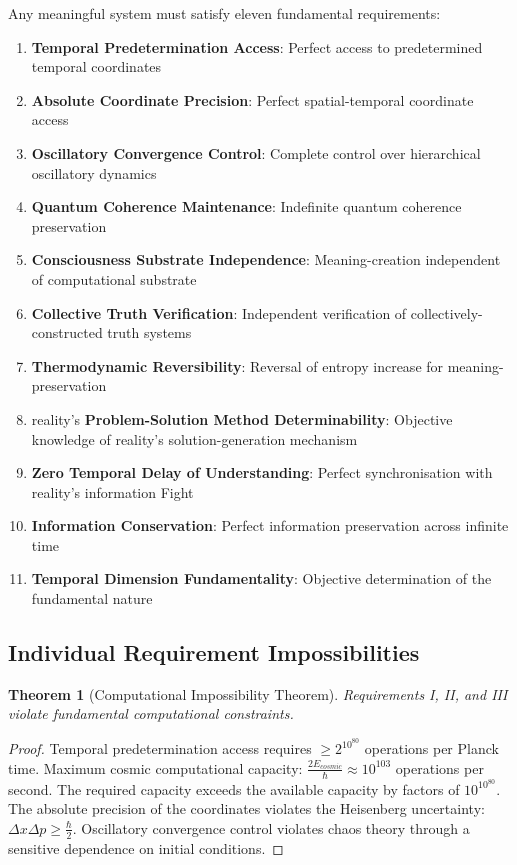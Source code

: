 \documentclass[12pt,a4paper]{article}
\newtheorem{theorem}{Theorem}[section]
\begin{document}
Any meaningful system must satisfy eleven fundamental requirements:

\begin{enumerate}
\item \textbf{Temporal Predetermination Access}: Perfect access to predetermined temporal coordinates
\item \textbf{Absolute Coordinate Precision}: Perfect spatial-temporal coordinate access
\item \textbf{Oscillatory Convergence Control}: Complete control over hierarchical oscillatory dynamics
\item \textbf{Quantum Coherence Maintenance}: Indefinite quantum coherence preservation
\item \textbf{Consciousness Substrate Independence}: Meaning-creation independent of computational substrate
\item \textbf{Collective Truth Verification}: Independent verification of collectively-constructed truth systems
\item \textbf{Thermodynamic Reversibility}: Reversal of entropy increase for meaning-preservation
\item reality's \textbf{ Problem-Solution Method Determinability}: Objective knowledge of reality's solution-generation mechanism
\item \textbf{Zero Temporal Delay of Understanding}: Perfect synchronisation with reality's information Fight
\item \textbf{Information Conservation}: Perfect information preservation across infinite time
\item \textbf{Temporal Dimension Fundamentality}: Objective determination of the fundamental nature
\end{enumerate}

\subsection{Individual Requirement Impossibilities}

\begin{theorem}[Computational Impossibility Theorem]
Requirements I, II, and III violate fundamental computational constraints.
\end{theorem}

\begin{proof}
Temporal predetermination access requires $\geq 2^{10^{80}}$ operations per Planck time. Maximum cosmic computational capacity: $\frac{2E_{cosmic}}{\hbar} \approx 10^{103}$ operations per second. The required capacity exceeds the available capacity by factors of $10^{10^{80}}$. The absolute precision of the coordinates violates the Heisenberg uncertainty: $\Delta x \Delta p \geq \frac{\hbar}{2}$. Oscillatory convergence control violates chaos theory through a sensitive dependence on initial conditions.
\end{proof}
\end{document}
